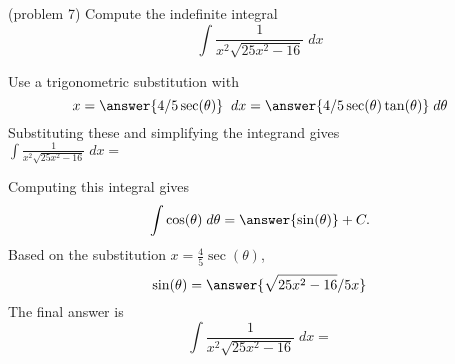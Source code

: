 \documentclass[handout]{ximera}
\begin{document}
\begin{problem}(problem 7)
Compute the indefinite integral
\[
\int \frac{1}{x^2\sqrt{25x^2-16}} \; dx
\]


Use a trigonometric substitution with\\
\[
x = \answer{4/5 \sec(\theta)} \;\; dx = \answer{4/5 \sec(\theta)\tan(\theta)} \; d\theta
\]
Substituting these and simplifying the integrand gives\\
$\displaystyle{\int  \frac{1}{x^2 \sqrt{ 25x^2 -16}}\; dx =}$\\
\begin{multipleChoice}
\end{multipleChoice}

Computing this integral gives
\[
\int \cos(\theta) \; d\theta = \answer{\sin(\theta) } + C.
\]
Based on the substitution $x = \frac45\sec(\theta)$, \\
\[
\sin(\theta) = \answer{\sqrt{25x^2 -16}/5x}
\]
The final answer is
\[
\int   \frac{1}{x^2\sqrt{25x^2-16}} \; dx = 
\]

\begin{center}
\begin{multipleChoice}
\end{multipleChoice}
\end{center}


\end{problem}
\end{document}
